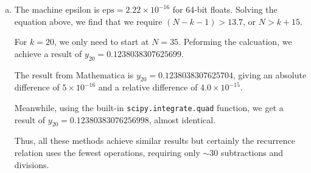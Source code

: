 \documentclass[12pt]{article}
\begin{document}
\begin{enumerate}[(a)]
\item 
The machine epsilon is $\mathrm{eps} = 2.22\times10^{-16}$ for 64-bit floats. Solving the equation above, we find that we require $(N - k - 1) > 13.7$, or $N > k + 15$.

For $k = 20$, we only need to start at $N = 35$. Peforming the calcuation, we achieve a result of $y_{20} = 0.1238038307625699$.

The result from Mathematica is $y_{20} = 0.1238038307625704$, giving an absolute difference of $5\times10^{-16}$ and a relative difference of $4.0\times10^{-15}$. 

Meanwhile, using the built-in \texttt{scipy.integrate.quad} function, we get a result of $y_{20} = 0.12380383076256998$, almost identical. 

Thus, all these methods achieve similar results but certainly the recurrence relation uses the fewest operations, requiring only $\sim 30$ subtractions and divisions.




\end{enumerate}
\end{document}

